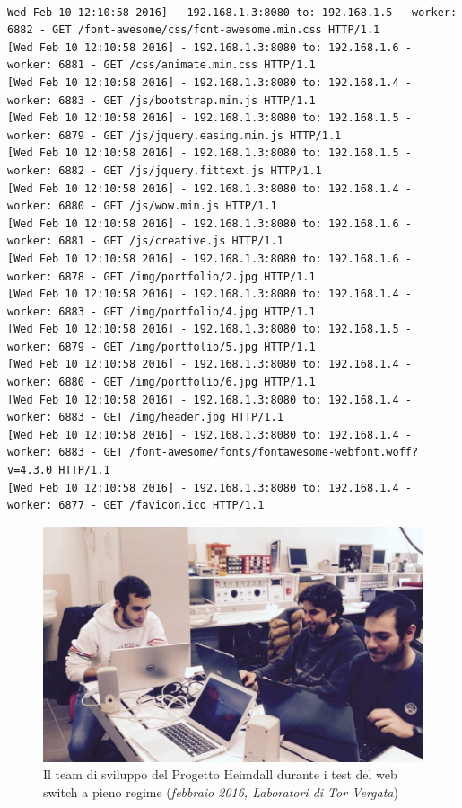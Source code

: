 \documentclass[italian]{tktltiki2}
\begin{document}
\begin{lstlisting}[basicstyle=\fontsize{4}{7}\selectfont\ttfamily]

Wed Feb 10 12:10:58 2016] - 192.168.1.3:8080 to: 192.168.1.5 - worker: 6882 - GET /font-awesome/css/font-awesome.min.css HTTP/1.1
[Wed Feb 10 12:10:58 2016] - 192.168.1.3:8080 to: 192.168.1.6 - worker: 6881 - GET /css/animate.min.css HTTP/1.1
[Wed Feb 10 12:10:58 2016] - 192.168.1.3:8080 to: 192.168.1.4 - worker: 6883 - GET /js/bootstrap.min.js HTTP/1.1
[Wed Feb 10 12:10:58 2016] - 192.168.1.3:8080 to: 192.168.1.5 - worker: 6879 - GET /js/jquery.easing.min.js HTTP/1.1
[Wed Feb 10 12:10:58 2016] - 192.168.1.3:8080 to: 192.168.1.5 - worker: 6882 - GET /js/jquery.fittext.js HTTP/1.1
[Wed Feb 10 12:10:58 2016] - 192.168.1.3:8080 to: 192.168.1.4 - worker: 6880 - GET /js/wow.min.js HTTP/1.1
[Wed Feb 10 12:10:58 2016] - 192.168.1.3:8080 to: 192.168.1.6 - worker: 6881 - GET /js/creative.js HTTP/1.1
[Wed Feb 10 12:10:58 2016] - 192.168.1.3:8080 to: 192.168.1.6 - worker: 6878 - GET /img/portfolio/2.jpg HTTP/1.1
[Wed Feb 10 12:10:58 2016] - 192.168.1.3:8080 to: 192.168.1.4 - worker: 6883 - GET /img/portfolio/4.jpg HTTP/1.1
[Wed Feb 10 12:10:58 2016] - 192.168.1.3:8080 to: 192.168.1.5 - worker: 6879 - GET /img/portfolio/5.jpg HTTP/1.1
[Wed Feb 10 12:10:58 2016] - 192.168.1.3:8080 to: 192.168.1.4 - worker: 6880 - GET /img/portfolio/6.jpg HTTP/1.1
[Wed Feb 10 12:10:58 2016] - 192.168.1.3:8080 to: 192.168.1.4 - worker: 6883 - GET /img/header.jpg HTTP/1.1
[Wed Feb 10 12:10:58 2016] - 192.168.1.3:8080 to: 192.168.1.4 - worker: 6883 - GET /font-awesome/fonts/fontawesome-webfont.woff?v=4.3.0 HTTP/1.1
[Wed Feb 10 12:10:58 2016] - 192.168.1.3:8080 to: 192.168.1.4 - worker: 6877 - GET /favicon.ico HTTP/1.1

\end{lstlisting}

\newpage
\begin{figure}[H]
\centering
\includegraphics[width=\textwidth]{images/team}
\caption{Il team di sviluppo del Progetto Heimdall durante i test del web switch a pieno regime (\emph{febbraio 2016, Laboratori di Tor Vergata})}
\end{figure}
\end{document}
